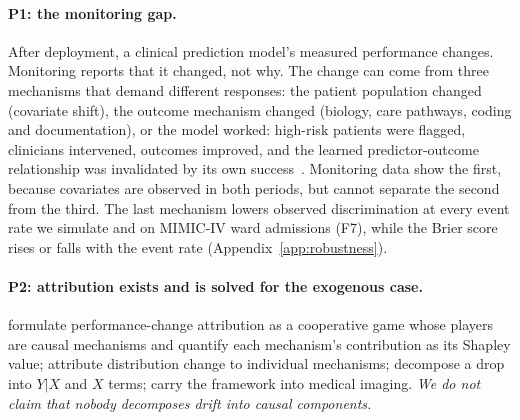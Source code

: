 \documentclass[letterpaper]{article} %
\begin{document}
\paragraph{P1: the monitoring gap.} After deployment, a clinical prediction
model's measured performance changes. Monitoring reports that it changed, not
why. The change can come from three mechanisms that demand different
responses: the patient population changed (covariate shift), the outcome
mechanism changed (biology, care pathways, coding and documentation), or the
model worked: high-risk patients were flagged, clinicians intervened, outcomes
improved, and the learned predictor-outcome relationship was invalidated by its
own success~\citep{lenert2019victims, sperrin2019explicit,
balcarcel2025feedback}. Monitoring data show the first, because covariates are
observed in both periods, but cannot separate the second from the third. The
last mechanism lowers observed
discrimination at every event rate we simulate and on MIMIC-IV ward admissions
(F7), while the Brier score rises or falls with the event rate
(Appendix~\ref{app:robustness}).

\paragraph{P2: attribution exists and is solved for the exogenous case.}
\citet{zhang2023attributing} formulate performance-change
attribution as a cooperative game whose players are causal mechanisms and
quantify each mechanism's contribution as its Shapley value; \citet{budhathoki2021rootcauses} attribute distribution change to individual
mechanisms; \citet{cai2023disde} decompose a drop into $Y|X$ and $X$
terms; \citet{gordaliza2025causal} carry the framework into
medical imaging. \emph{We do not claim that nobody decomposes drift into
causal components.}
\end{document}
